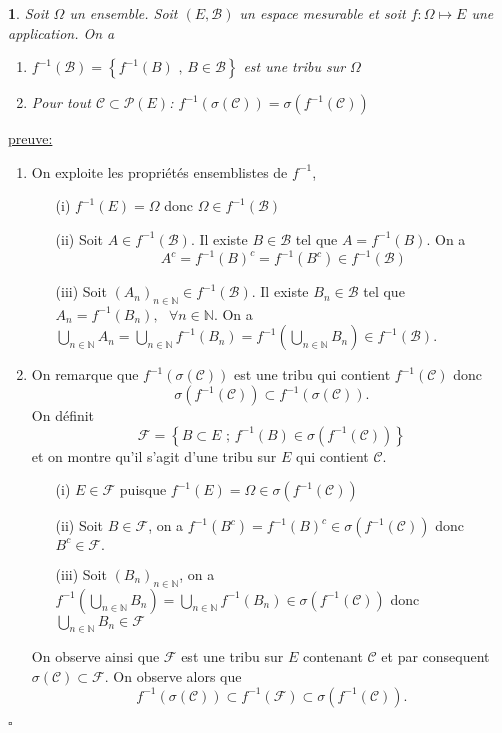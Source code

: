 \documentclass[8pt,notheorems]{beamer}
\def \Om{\Omega}
\def \N{\mathbb N}
\newtheorem{theorem}{\translate{Theorem}}[section]
\newtheorem{theorem}{\translate{Theoreme}}
\theoremstyle{definition}
\theoremstyle{example}
\theoremstyle{mystyle}
\theoremstyle{plain}
\begin{document}
\begin{frame}[allowframebreaks]
\begin{theorem}\label{theo:theo1}
Soit $\Omega$ un ensemble. Soit $(E, \mathcal{B})$ un espace mesurable et soit $f:\Omega\mapsto E$ une application. On a 
\begin{enumerate}
\item $f^{-1}(\mathcal{B}) = \left\{f^{-1}(B)\text{ , }B\in\mathcal{B}\right\}$ est une tribu sur $\Om$
\item Pour tout $\mathcal{C}\subset\mathcal{P}(E)$: $f^{-1}(\sigma(\mathcal{C}))=\sigma(f^{-1}(\mathcal{C}))$
\end{enumerate}
\end{theorem}
\underline{preuve:}\\
\begin{enumerate}
\item On exploite les propriétés ensemblistes de $f^{-1}$,
\begin{itemize}
\item[(i)] $f^{-1}(E)=\Om$ donc $\Om\in f^{-1}(\mathcal{B})$
\item[(ii)] Soit $A\in f^{-1}(\mathcal{B})$. Il existe $B\in \mathcal{B}$ tel que $A=f^{-1}(B)$. On a 
$$
A^c =f^{-1}(B)^{c} =  f^{-1}(B^{c})\in f^{-1}(\mathcal{B})$$
\item[(iii)] Soit $(A_n)_{n\in\N}\in f^{-1}(\mathcal{B})$. Il existe $B_n\in \mathcal{B}$ tel que $A_n=f^{-1}(B_n) ,\text{ }\forall n\in\N$. On a $\bigcup_{n\in\N}A_n=\bigcup_{n\in\N}f^{-1}(B_n)=f^{-1}\left(\bigcup_{n\in\N}B_n\right)\in f^{-1}(\mathcal{B})$.
\end{itemize} 
\item On remarque que $f^{-1}(\sigma(\mathcal{C}))$ est une tribu qui contient $f^{-1}(\mathcal{C})$ donc 
$$
\sigma(f^{-1}(\mathcal{C}))\subset f^{-1}(\sigma(\mathcal{C})).
$$ 
On définit
$$
\mathcal{F}=\left\{B\subset E\text{ ; } f^{-1}(B)\in\sigma\left(f^{-1}(\mathcal{C})\right)\right\}
$$
et on montre qu'il s'agit d'une tribu sur $E$ qui contient $\mathcal{C}$. 
\begin{itemize}
\item[(i)] $E\in\mathcal{F}$ puisque $f^{-1}(E)=\Om\in\sigma\left(f^{-1}(\mathcal{C})\right)$
\item[(ii)] Soit $B\in\mathcal{F}$, on a $f^{-1}(B^{c})=f^{-1}(B)^{c}\in\sigma\left(f^{-1}(\mathcal{C})\right)$ donc $B^c\in\mathcal{F}.$
\item[(iii)] Soit $(B_{n})_{n\in\N}$, on a $f^{-1}(\bigcup_{n\in\N}B_n)=\bigcup_{n\in\N}f^{-1}(B_n)\in\sigma\left(f^{-1}(\mathcal{C})\right)$ donc $\bigcup_{n\in\N}B_n\in\mathcal{F}$
\end{itemize}
On observe ainsi que $\mathcal{F}$ est une tribu sur $E$ contenant $\mathcal{C}$ et par consequent $\sigma(\mathcal{C})\subset\mathcal{F}$. On observe alors que 
$$
f^{-1}(\sigma(\mathcal{C}))\subset f^{-1}(\mathcal{F})\subset \sigma(f^{-1}(\mathcal{C})).
$$
\end{enumerate}
$\square$\\

\end{frame}
\end{document}
